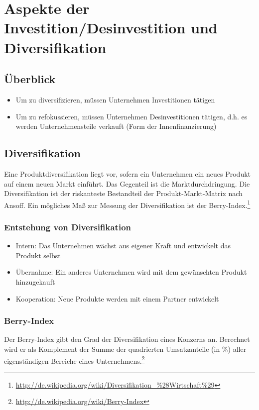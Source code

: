 \section{Aspekte der Investition/Desinvestition und Diversifikation}

\subsection{Überblick}
\begin{itemize}
	\item Um zu diversifizieren, müssen Unternehmen Investitionen tätigen
	\item Um zu refokussieren, müssen Unternehmen Desinvestitionen tätigen, d.h. es werden Unternehmensteile verkauft (Form der Innenfinanzierung)
\end{itemize}


\subsection{Diversifikation}
Eine Produktdiversifikation liegt vor, sofern ein Unternehmen ein neues Produkt auf einem neuen Markt einführt. Das Gegenteil ist die Marktdurchdringung. Die Diversifikation ist der riskanteste Bestandteil der Produkt-Markt-Matrix nach Ansoff. Ein mögliches Maß zur Messung der Diversifikation ist der Berry-Index.\footnote{\url{http://de.wikipedia.org/wiki/Diversifikation_\%28Wirtschaft\%29}}

\subsubsection{Entstehung von Diversifikation}
\begin{itemize}
	\item Intern: Das Unternehmen wächst aus eigener Kraft und entwickelt das Produkt selbst
	\item Übernahme: Ein anderes Unternehmen wird mit dem gewünschten Produkt hinzugekauft
	\item Kooperation: Neue Produkte werden mit einem Partner entwickelt
\end{itemize}

\subsubsection{Berry-Index}
Der Berry-Index gibt den Grad der Diversifikation eines Konzerns an. Berechnet wird er als Komplement der Summe der quadrierten Umsatzanteile (in \%) aller eigenständigen Bereiche eines Unternehmens.\footnote{\url{http://de.wikipedia.org/wiki/Berry-Index}}

